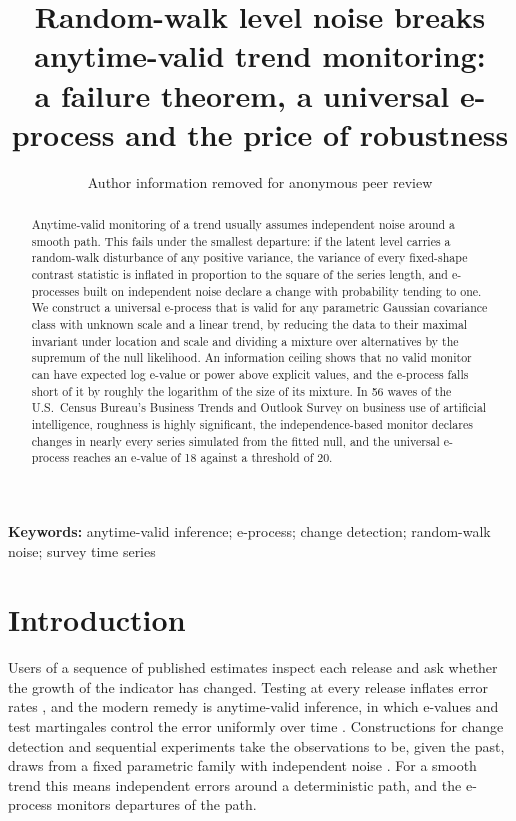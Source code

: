 \documentclass[11pt]{article}
\title{Random-walk level noise breaks anytime-valid trend monitoring:\\ a failure theorem, a universal e-process and the price of robustness}
\author{Author information removed for anonymous peer review}
\date{}
\theoremstyle{plain}
\theoremstyle{definition}
\begin{document}
\maketitle

\begin{abstract}
Anytime-valid monitoring of a trend usually assumes independent noise around a smooth path. This fails under the smallest departure: if the latent level carries a random-walk disturbance of any positive variance, the variance of every fixed-shape contrast statistic is inflated in proportion to the square of the series length, and e-processes built on independent noise declare a change with probability tending to one. We construct a universal e-process that is valid for any parametric Gaussian covariance class with unknown scale and a linear trend, by reducing the data to their maximal invariant under location and scale and dividing a mixture over alternatives by the supremum of the null likelihood. An information ceiling shows that no valid monitor can have expected log e-value or power above explicit values, and the e-process falls short of it by roughly the logarithm of the size of its mixture. In 56 waves of the U.S.\ Census Bureau's Business Trends and Outlook Survey on business use of artificial intelligence, roughness is highly significant, the independence-based monitor declares changes in nearly every series simulated from the fitted null, and the universal e-process reaches an e-value of 18 against a threshold of 20.
\end{abstract}

\noindent\textbf{Keywords:} anytime-valid inference; e-process; change detection; random-walk noise; survey time series

\section{Introduction}

Users of a sequence of published estimates inspect each release and ask whether the growth of the indicator has changed. Testing at every release inflates error rates \citep{armitage1969}, and the modern remedy is anytime-valid inference, in which e-values and test martingales control the error uniformly over time \citep{howard2021,vovk2021,ramdas2023,grunwald2024}. Constructions for change detection and sequential experiments take the observations to be, given the past, draws from a fixed parametric family with independent noise \citep{johari2022,shin2023,shin2024}. For a smooth trend this means independent errors around a deterministic path, and the e-process monitors departures of the path.
\end{document}
